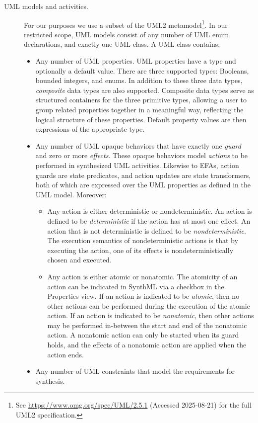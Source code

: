 \documentclass{article}
\theoremstyle{definition}
\begin{document}
\begin{description}
	\item[UML models and activities.]
	For our purposes we use a subset of the UML2 metamodel\footnote{See \url{https://www.omg.org/spec/UML/2.5.1} (Accessed 2025-08-21) for the full UML2 specification.}.
	In our restricted scope, UML models consist of any number of UML enum declarations, and exactly one UML class.
	A UML class contains:
	\begin{itemize}
		\item Any number of UML properties.
		UML properties have a type and optionally a default value.
		There are three supported types: Booleans, bounded integers, and enums.
		In addition to these three data types, \emph{composite} data types are also supported.
		Composite data types serve as structured containers for the three primitive types, allowing a user to group related properties together in a meaningful way, reflecting the logical structure of these properties.
		Default property values are then expressions of the appropriate type.
		\item Any number of UML opaque behaviors that have exactly one \emph{guard} and zero or more \emph{effects}.
		These opaque behaviors model \emph{actions} to be performed in synthesized UML activities.
		Likewise to EFAs, action guards are state predicates, and action updates are state transformers, both of which are expressed over the UML properties as defined in the UML model.
		Moreover:
		\begin{itemize}
			\item Any action is either deterministic or nondeterministic.
			An action is defined to be \emph{deterministic} if the action has at most one effect.
			An action that is not deterministic is defined to be \emph{nondeterministic}.
			The execution semantics of nondeterministic actions is that by executing the action, one of its effects is nondeterministically chosen and executed.
			\item Any action is either atomic or nonatomic.
			The atomicity of an action can be indicated in SynthML via a checkbox in the Properties view.
			If an action is indicated to be \emph{atomic}, then no other actions can be performed during the execution of the atomic action.
			If an action is indicated to be \emph{nonatomic}, then other actions may be performed in-between the start and end of the nonatomic action.
			A nonatomic action can only be started when its guard holds, and the effects of a nonatomic action are applied when the action ends.
		\end{itemize}
		\item Any number of UML constraints that model the requirements for synthesis.

\end{itemize}
\end{description}
\end{document}
